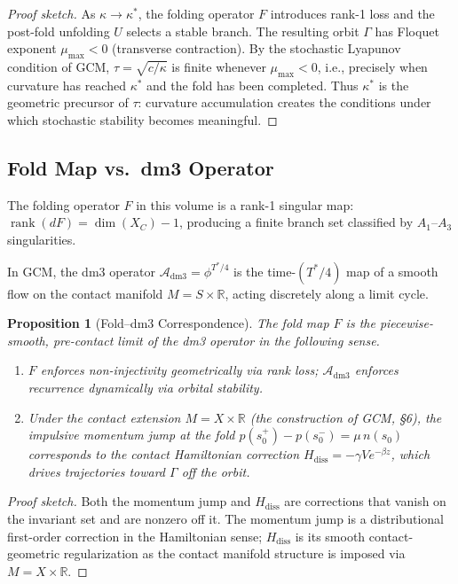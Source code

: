 \documentclass[12pt, oneside]{book}
\theoremstyle{plain}
\newtheorem{proposition}[theorem]{Proposition}
\theoremstyle{definition}
\theoremstyle{remark}
\begin{document}
\begin{proof}[Proof sketch]
As $\kappa \to \kappa^*$, the folding operator $F$ introduces
rank-1 loss and the post-fold unfolding $U$ selects a stable branch.
The resulting orbit $\Gamma$ has Floquet exponent
$\mu_{\max} < 0$ (transverse contraction). By the stochastic
Lyapunov condition of GCM, $\tau = \sqrt{c/\kappa}$ is finite
whenever $\mu_{\max} < 0$, i.e., precisely when curvature has
reached $\kappa^*$ and the fold has been completed. Thus
$\kappa^*$ is the geometric precursor of $\tau$: curvature
accumulation creates the conditions under which stochastic stability
becomes meaningful.
\end{proof}

\subsection{Fold Map vs.\ dm3 Operator}

The folding operator $F$ in this volume is a rank-1 singular map:
$\operatorname{rank}(dF) = \dim(X_C) - 1$, producing a finite
branch set classified by $A_1$--$A_3$ singularities.

In GCM, the dm3 operator
$\mathcal{A}_{\mathrm{dm3}} = \phi^{T^*/4}$
is the time-$(T^*/4)$ map of a smooth flow on the contact manifold
$M = S \times \mathbb{R}$, acting discretely along a limit cycle.

\begin{proposition}[Fold--dm3 Correspondence]\label{prop:fold}
The fold map $F$ is the piecewise-smooth, pre-contact limit of the
dm3 operator in the following sense.
\begin{enumerate}[label=\textup{(\roman*)}]
  \item $F$ enforces non-injectivity geometrically via rank loss;
        $\mathcal{A}_{\mathrm{dm3}}$ enforces recurrence dynamically
        via orbital stability.
  \item Under the contact extension $M = X \times \mathbb{R}$
        \textup{(}the construction of GCM, \S6\textup{)}, the
        impulsive momentum jump at the fold
        $p(s_0^+) - p(s_0^-) = \mu\,n(s_0)$
        corresponds to the contact Hamiltonian correction
        $H_{\mathrm{diss}} = -\gamma V e^{-\beta z}$,
        which drives trajectories toward $\Gamma$ off the orbit.
\end{enumerate}
\end{proposition}

\begin{proof}[Proof sketch]
Both the momentum jump and $H_{\mathrm{diss}}$ are corrections
that vanish on the invariant set and are nonzero off it. The
momentum jump is a distributional first-order correction in the
Hamiltonian sense; $H_{\mathrm{diss}}$ is its smooth
contact-geometric regularization as the contact manifold structure
is imposed via $M = X \times \mathbb{R}$.
\end{proof}
\end{document}
